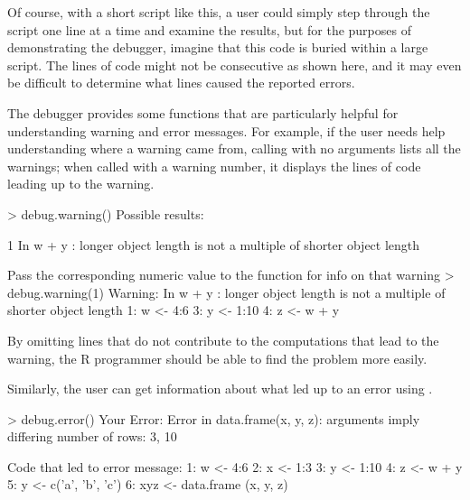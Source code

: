 %

%

Of course, with a short script like this, a user could simply step through the script one line at a time and examine the results, but for the purposes of demonstrating the debugger, imagine that this code is buried within a large script.  The lines of code might not be consecutive as shown here, and it may even be difficult to determine what lines caused the reported errors.


The debugger provides some functions that are particularly helpful for understanding warning and error messages.  For example, if the user needs help understanding where a warning came from, calling  with no arguments lists all the warnings; when called with a warning number, it displays the lines of code leading up to the warning.
\begin{example}
> debug.warning()
Possible results: 
                                                                              
1 In  w + y :  longer object length is not a multiple of shorter object length

Pass the corresponding numeric value to the function for info on that warning
> debug.warning(1)
Warning: In  w + y :  longer object length is not a multiple of shorter object length 
	1: 	 w <- 4:6 
	3: 	 y <- 1:10 
	4: 	 z <- w + y 
\end{example}
By omitting lines that do not contribute to the computations that lead to the warning, the R programmer should be able to find the problem more easily.

Similarly, the user can get information about what led up to an error using .
\begin{example}
> debug.error()
Your Error: Error in data.frame(x, y, z): arguments imply differing number of rows: 3, 10

Code that led to error message:
	1: 	 w <- 4:6 
	2: 	 x <- 1:3 
	3: 	 y <- 1:10 
	4: 	 z <- w + y 
	5: 	 y <- c('a', 'b', 'c') 
	6: 	 xyz <- data.frame (x, y, z) 
\end{example}

